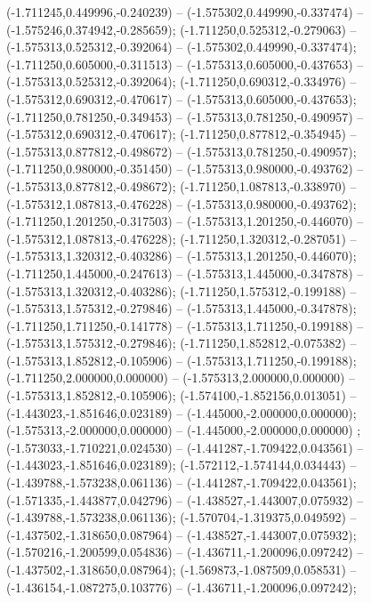 (-1.711245,0.449996,-0.240239) -- (-1.575302,0.449990,-0.337474) -- (-1.575246,0.374942,-0.285659);
 (-1.711250,0.525312,-0.279063) -- (-1.575313,0.525312,-0.392064) -- (-1.575302,0.449990,-0.337474);
 (-1.711250,0.605000,-0.311513) -- (-1.575313,0.605000,-0.437653) -- (-1.575313,0.525312,-0.392064);
 (-1.711250,0.690312,-0.334976) -- (-1.575312,0.690312,-0.470617) -- (-1.575313,0.605000,-0.437653);
 (-1.711250,0.781250,-0.349453) -- (-1.575313,0.781250,-0.490957) -- (-1.575312,0.690312,-0.470617);
 (-1.711250,0.877812,-0.354945) -- (-1.575313,0.877812,-0.498672) -- (-1.575313,0.781250,-0.490957);
 (-1.711250,0.980000,-0.351450) -- (-1.575313,0.980000,-0.493762) -- (-1.575313,0.877812,-0.498672);
 (-1.711250,1.087813,-0.338970) -- (-1.575312,1.087813,-0.476228) -- (-1.575313,0.980000,-0.493762);
 (-1.711250,1.201250,-0.317503) -- (-1.575313,1.201250,-0.446070) -- (-1.575312,1.087813,-0.476228);
 (-1.711250,1.320312,-0.287051) -- (-1.575313,1.320312,-0.403286) -- (-1.575313,1.201250,-0.446070);
 (-1.711250,1.445000,-0.247613) -- (-1.575313,1.445000,-0.347878) -- (-1.575313,1.320312,-0.403286);
 (-1.711250,1.575312,-0.199188) -- (-1.575313,1.575312,-0.279846) -- (-1.575313,1.445000,-0.347878);
 (-1.711250,1.711250,-0.141778) -- (-1.575313,1.711250,-0.199188) -- (-1.575313,1.575312,-0.279846);
 (-1.711250,1.852812,-0.075382) -- (-1.575313,1.852812,-0.105906) -- (-1.575313,1.711250,-0.199188);
 (-1.711250,2.000000,0.000000) -- (-1.575313,2.000000,0.000000) -- (-1.575313,1.852812,-0.105906);
 (-1.574100,-1.852156,0.013051) -- (-1.443023,-1.851646,0.023189) -- (-1.445000,-2.000000,0.000000);
 (-1.575313,-2.000000,0.000000) -- (-1.445000,-2.000000,0.000000) ;
 (-1.573033,-1.710221,0.024530) -- (-1.441287,-1.709422,0.043561) -- (-1.443023,-1.851646,0.023189);
 (-1.572112,-1.574144,0.034443) -- (-1.439788,-1.573238,0.061136) -- (-1.441287,-1.709422,0.043561);
 (-1.571335,-1.443877,0.042796) -- (-1.438527,-1.443007,0.075932) -- (-1.439788,-1.573238,0.061136);
 (-1.570704,-1.319375,0.049592) -- (-1.437502,-1.318650,0.087964) -- (-1.438527,-1.443007,0.075932);
 (-1.570216,-1.200599,0.054836) -- (-1.436711,-1.200096,0.097242) -- (-1.437502,-1.318650,0.087964);
 (-1.569873,-1.087509,0.058531) -- (-1.436154,-1.087275,0.103776) -- (-1.436711,-1.200096,0.097242);
